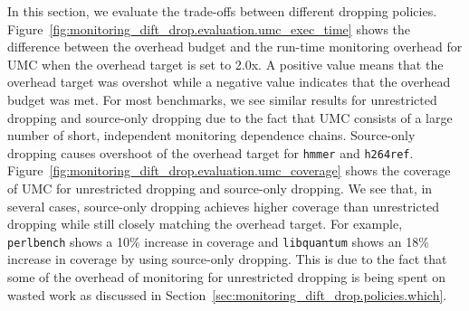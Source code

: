 In this section, we evaluate the trade-offs between different dropping
policies.  Figure~\ref{fig:monitoring_dift_drop.evaluation.umc_exec_time} shows
the difference between the overhead budget and the run-time monitoring overhead
for UMC when the overhead target is set to 2.0x. A positive value means that
the overhead target was overshot while a negative value indicates that the
overhead budget was met. For most benchmarks, we see similar results for
unrestricted dropping and source-only dropping due to the fact that UMC
consists of a large number of short, independent monitoring dependence chains.
Source-only dropping causes overshoot of the overhead target for {\tt hmmer}
and {\tt h264ref}.
Figure~\ref{fig:monitoring_dift_drop.evaluation.umc_coverage} shows the
coverage of UMC for unrestricted dropping and source-only dropping. We see
that, in several cases, source-only dropping achieves higher coverage than
unrestricted dropping while still closely matching the overhead target. For
example, {\tt perlbench} shows a 10\% increase in coverage and {\tt libquantum}
shows an 18\% increase in coverage by using source-only dropping. This is due
to the fact that some of the overhead of monitoring for unrestricted dropping
is being spent on wasted work as discussed in
Section~\ref{sec:monitoring_dift_drop.policies.which}.


